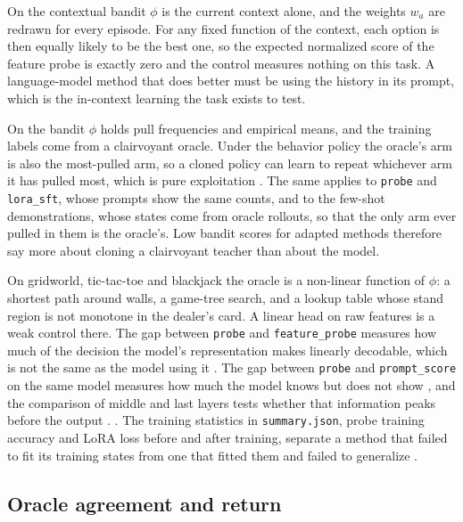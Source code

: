 On the contextual bandit $\phi$ is the current context alone, and the weights $w_a$ are redrawn for every episode. For any fixed function of the context, each option is then equally likely to be the best one, so the expected normalized score of the feature probe is exactly zero and the control measures nothing on this task. A language-model method that does better must be using the history in its prompt, which is the in-context learning the task exists to test.

On the bandit $\phi$ holds pull frequencies and empirical means, and the training labels come from a clairvoyant oracle. Under the behavior policy the oracle's arm is also the most-pulled arm, so a cloned policy can learn to repeat whichever arm it has pulled most, which is pure exploitation \citep{laskin2023incontext,nie2025evolve}. The same applies to \texttt{probe} and \texttt{lora\_sft}, whose prompts show the same counts, and to the few-shot demonstrations, whose states come from oracle rollouts, so that the only arm ever pulled in them is the oracle's. Low bandit scores for adapted methods therefore say more about cloning a clairvoyant teacher than about the model.

On gridworld, tic-tac-toe and blackjack the oracle is a non-linear function of $\phi$: a shortest path around walls, a game-tree search, and a lookup table whose stand region is not monotone in the dealer's card. A linear head on raw features is a weak control there. The gap between \texttt{probe} and \texttt{feature\_probe} measures how much of the decision the model's representation makes linearly decodable, which is not the same as the model using it \citep{belinkov2022probing}. The gap between \texttt{probe} and \texttt{prompt\_score} on the same model measures how much the model knows but does not show \citep{orgad2025know}, and the comparison of middle and last layers tests whether that information peaks before the output \citep{skean2025layer}. . The training statistics in \texttt{summary.json}, probe training accuracy and LoRA loss before and after training, separate a method that failed to fit its training states from one that fitted them and failed to generalize .

\subsection{Oracle agreement and return}
\label{sec:analysis:agreement}

